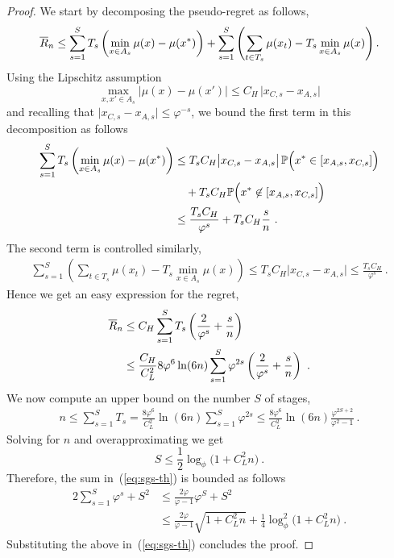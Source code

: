 \begin{proof}
We start by decomposing the pseudo-regret as follows,
$$\oR_n \leq \sum_{s=1}^S T_s \left(\min_{x \in A_s}\mu(x) - \mu(x^*)\right) + \sum_{s=1}^S \left( \sum_{t\in T_s} \mu(x_t) - T_s \min_{x \in A_s} \mu(x) \right) .$$
Using the Lipschitz assumption
\[
    \max_{x,x'\in A_s}\bigl|\mu(x)-\mu(x')\bigr| \le C_H\,\bigl|x_{C,s} - x_{A,s}\bigr|
\]
and recalling that $\bigl|x_{C,s} - x_{A,s}\bigr| \le \varphi^{-s}$, we bound the first term in this decomposition as follows
\begin{align*}
    \sum_{s=1}^S T_s \left(\min_{x \in A_s}\mu(x) - \mu(x^*)\right)
&\le
    T_s C_H \bigl|x_{C,s} - x_{A,s}\bigr| \, \P\Bigl(x^* \in [x_{A,s},x_{C,s}]\Bigr)
\\ &\quad
    + T_s C_H \P\Bigl(x^* \not\in [x_{A,s},x_{C,s}]\Bigr)
\\ &\le
    \frac{T_s C_H}{\varphi^s} + T_s C_H \frac{s}{n}~.
\end{align*}
The second term is controlled similarly,
\begin{align*}
    \sum_{s=1}^S \left( \sum_{t\in T_s} \mu(x_t) - T_s \min_{x \in A_s} \mu(x) \right)
\le
    T_s C_H \bigl|x_{C,s} - x_{A,s}\bigr|
\le
    \frac{T_s C_H}{\varphi^s}~.
\end{align*}
Hence we get an easy expression for the regret,
\begin{align}
\nonumber
    \oR_n
&\le
    C_H \sum_{s=1}^S T_s\left(\frac{2}{\varphi^s} + \frac{s}{n}\right)
\\& \le
\label{eq:sgs-th}
    \frac{C_H}{C_L^2}8\varphi^6\ln(6n) \sum_{s=1}^S \varphi^{2s}\left(\frac{2}{\varphi^s} + \frac{s}{n}\right)~.
\end{align}
We now compute an upper bound on the number $S$ of stages,
\begin{align*}
    n \le \sum_{s=1}^S T_s = \frac{8\varphi^6}{C_L^2}\ln(6n)\sum_{s=1}^S \varphi^{2s} \le \frac{8\varphi^6}{C_L^2}\ln(6n)\frac{\varphi^{2S+2}}{\varphi^2 - 1}~.
\end{align*}
Solving for $n$ and overapproximating we get
\[
    S \le \frac{1}{2}\log_{\phi}\bigl(1 + C_L^2 n\bigr)~.
\]
Therefore, the sum in~(\ref{eq:sgs-th}) is bounded as follows 
\begin{align*}
    2\sum_{s=1}^S \varphi^s + S^2
&\le
    \frac{2\varphi}{\varphi-1}\varphi^S + S^2
\\&\le
    \frac{2\varphi}{\varphi-1}\sqrt{1 + C_L^2 n} + \frac{1}{4}\log_{\phi}^2\bigl(1 + C_L^2 n\bigr)~.
\end{align*}
Substituting the above in~(\ref{eq:sgs-th}) concludes the proof.
\end{proof}


